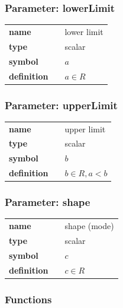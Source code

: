 \documentclass{article}
\begin{document}
\subsubsection*{Parameter: lowerLimit}

\noindent\begin{tabular}{p{2cm}cl}
\textbf{name} & & lower limit \\
\textbf{type} & & scalar \\
\textbf{symbol} & & $a$  \\
\textbf{definition} & & $a \in R$
\end{tabular}
\subsubsection*{Parameter: upperLimit}

\noindent\begin{tabular}{p{2cm}cl}
\textbf{name} & & upper limit \\
\textbf{type} & & scalar \\
\textbf{symbol} & & $b$  \\
\textbf{definition} & & $b \in R, a < b$
\end{tabular}
\subsubsection*{Parameter: shape}

\noindent\begin{tabular}{p{2cm}cl}
\textbf{name} & & shape (mode) \\
\textbf{type} & & scalar \\
\textbf{symbol} & & $c$  \\
\textbf{definition} & & $c \in R$
\end{tabular}
\subsubsection*{Functions}
\end{document}
